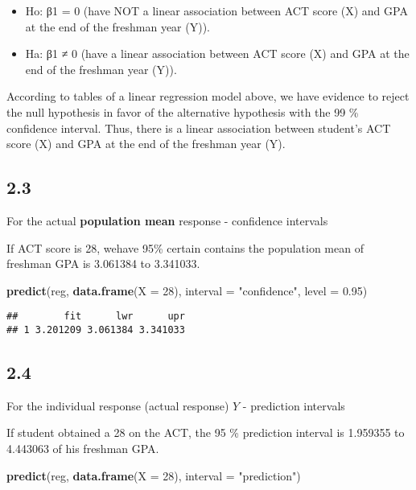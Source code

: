 \documentclass[
]{article}
\newenvironment{Shaded}{\begin{snugshade}}{\end{snugshade}}
\newcommand{\DataTypeTok}[1]{\textcolor[rgb]{0.13,0.29,0.53}{#1}}
\newcommand{\DecValTok}[1]{\textcolor[rgb]{0.00,0.00,0.81}{#1}}
\newcommand{\FloatTok}[1]{\textcolor[rgb]{0.00,0.00,0.81}{#1}}
\newcommand{\KeywordTok}[1]{\textcolor[rgb]{0.13,0.29,0.53}{\textbf{#1}}}
\newcommand{\NormalTok}[1]{#1}
\newcommand{\StringTok}[1]{\textcolor[rgb]{0.31,0.60,0.02}{#1}}
\providecommand{\tightlist}{%
  \setlength{\itemsep}{0pt}\setlength{\parskip}{0pt}}
\begin{document}
\begin{itemize}
\tightlist
\item
  Ho: β1 = 0 (have NOT a linear association between ACT score (X) and
  GPA at the end of the freshman year (Y)).
\item
  Ha: β1 ≠ 0 (have a linear association between ACT score (X) and GPA at
  the end of the freshman year (Y)).
\end{itemize}

According to tables of a linear regression model above, we have evidence
to reject the null hypothesis in favor of the alternative hypothesis
with the 99 \% confidence interval. Thus, there is a linear association
between student's ACT score (X) and GPA at the end of the freshman year
(Y).

\hypertarget{section-8}{%
\subsection{2.3}\label{section-8}}

For the actual \textbf{population mean} response - confidence intervals

If ACT score is 28, wehave 95\% certain contains the population mean of
freshman GPA is 3.061384 to 3.341033.

\begin{Shaded}
\begin{Highlighting}[]
\KeywordTok{predict}\NormalTok{(reg, }\KeywordTok{data.frame}\NormalTok{(}\DataTypeTok{X =} \DecValTok{28}\NormalTok{), }\DataTypeTok{interval =} \StringTok{"confidence"}\NormalTok{, }\DataTypeTok{level =} \FloatTok{0.95}\NormalTok{)}
\end{Highlighting}
\end{Shaded}

\begin{verbatim}
##        fit      lwr      upr
## 1 3.201209 3.061384 3.341033
\end{verbatim}

\hypertarget{section-9}{%
\subsection{2.4}\label{section-9}}

For the individual response (actual response) \(Y\) - prediction
intervals

If student obtained a 28 on the ACT, the 95 \% prediction interval is
1.959355 to 4.443063 of his freshman GPA.

\begin{Shaded}
\begin{Highlighting}[]
\KeywordTok{predict}\NormalTok{(reg, }\KeywordTok{data.frame}\NormalTok{(}\DataTypeTok{X =} \DecValTok{28}\NormalTok{), }\DataTypeTok{interval =} \StringTok{"prediction"}\NormalTok{)}
\end{Highlighting}
\end{Shaded}
\end{document}

